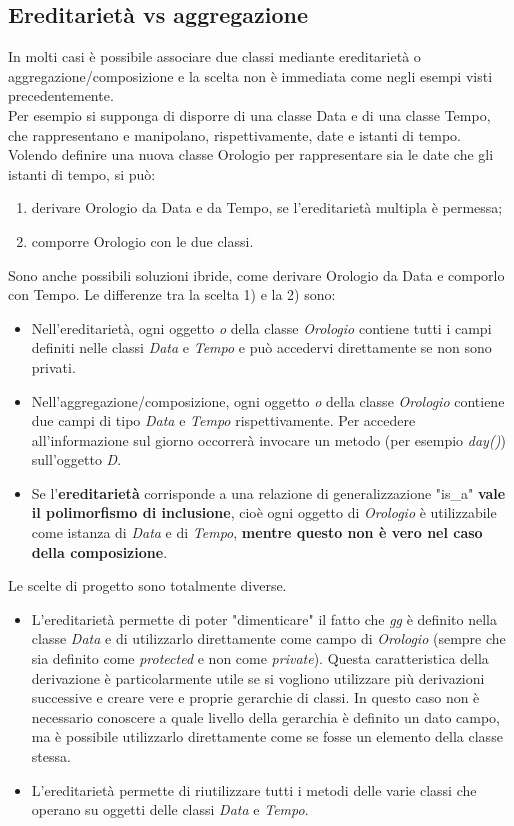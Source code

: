 \documentclass{article}
\begin{document}
	\subsection{Ereditarietà vs aggregazione}
	In molti casi è possibile associare due classi mediante ereditarietà o aggregazione/composizione e la scelta non è immediata come negli esempi visti precedentemente. \\
	Per esempio si supponga di disporre di una classe Data e di una classe Tempo, che rappresentano e manipolano, rispettivamente, date e istanti di tempo. Volendo definire una nuova classe Orologio per rappresentare sia le date che gli istanti di tempo, si può:
	\begin{enumerate}
		\item derivare Orologio da Data e da Tempo, se l'ereditarietà multipla è permessa;
		\item comporre Orologio con le due classi.
	\end{enumerate}
	Sono anche possibili soluzioni ibride, come derivare Orologio da Data e comporlo con Tempo.
	Le differenze tra la scelta 1) e la 2) sono:
	\begin{itemize}
		\item Nell'ereditarietà, ogni oggetto \textit{o} della classe \textit{Orologio} contiene tutti i campi definiti nelle classi \textit{Data} e \textit{Tempo} e può accedervi direttamente se non sono privati.
		\item Nell'aggregazione/composizione, ogni oggetto \textit{o} della classe \textit{Orologio} contiene due campi di tipo \textit{Data} e \textit{Tempo} rispettivamente. Per accedere all'informazione sul giorno occorrerà invocare un metodo (per esempio \textit{day()}) sull'oggetto \textit{D}.
		\item Se l'\textbf{ereditarietà} corrisponde a una relazione di generalizzazione "is\_a" \textbf{vale il polimorfismo di inclusione}, cioè ogni oggetto di \textit{Orologio} è utilizzabile come istanza di \textit{Data} e di \textit{Tempo}, \textbf{mentre questo non è vero nel caso della composizione}.
	\end{itemize}
	Le scelte di progetto sono totalmente diverse.
	\begin{itemize}
		\item L'ereditarietà permette di poter "dimenticare" il fatto che \textit{gg} è definito nella classe \textit{Data} e di utilizzarlo direttamente come campo di \textit{Orologio} (sempre che sia definito come \textit{protected} e non come \textit{private}). Questa caratteristica della derivazione è particolarmente utile se si vogliono utilizzare più derivazioni successive e creare vere e proprie gerarchie di classi. In questo caso non è necessario conoscere a quale livello della gerarchia è definito un dato campo, ma è possibile utilizzarlo direttamente come se fosse un elemento della classe stessa.
		\item L'ereditarietà permette di riutilizzare tutti i metodi delle varie classi che operano su oggetti delle classi \textit{Data} e \textit{Tempo}.
	\end{itemize}
\end{document}
